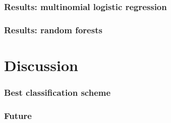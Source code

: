 \documentclass{beamer}\usepackage{graphicx, color}
\begin{document}
\begin{frame}
  \frametitle{Results: multinomial logistic regression}

\end{frame}

\begin{frame}
  \frametitle{Results: random forests}
\end{frame}


\section{Discussion}
\begin{frame}
  \frametitle{Best classification scheme}
\end{frame}

\begin{frame}
  \frametitle{Future}
\end{frame}
\end{document}

